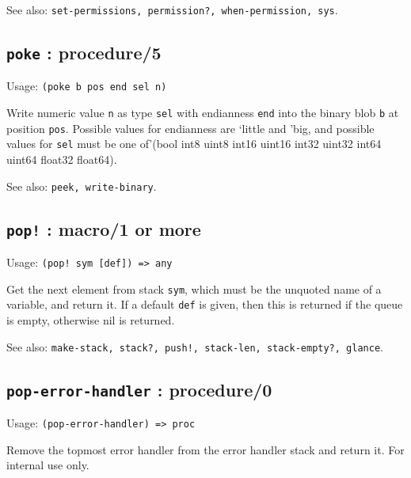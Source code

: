 \documentclass[
]{article}
\newcommand{\passthrough}[1]{#1}
\begin{document}
See also:
\passthrough{\lstinline!set-permissions, permission?, when-permission, sys!}.

\hypertarget{poke-procedure5-1}{%
\subsection{\texorpdfstring{\texttt{poke} :
procedure/5}{poke : procedure/5}}\label{poke-procedure5-1}}

Usage: \passthrough{\lstinline!(poke b pos end sel n)!}

Write numeric value \passthrough{\lstinline!n!} as type
\passthrough{\lstinline!sel!} with endianness
\passthrough{\lstinline!end!} into the binary blob
\passthrough{\lstinline!b!} at position \passthrough{\lstinline!pos!}.
Possible values for endianness are `little and 'big, and possible values
for \passthrough{\lstinline!sel!} must be one of'(bool int8 uint8 int16
uint16 int32 uint32 int64 uint64 float32 float64).

See also: \passthrough{\lstinline!peek, write-binary!}.

\hypertarget{pop-macro1-or-more-1}{%
\subsection{\texorpdfstring{\texttt{pop!} : macro/1 or
more}{pop! : macro/1 or more}}\label{pop-macro1-or-more-1}}

Usage: \passthrough{\lstinline"(pop! sym [def]) => any"}

Get the next element from stack \passthrough{\lstinline!sym!}, which
must be the unquoted name of a variable, and return it. If a default
\passthrough{\lstinline!def!} is given, then this is returned if the
queue is empty, otherwise nil is returned.

See also:
\passthrough{\lstinline"make-stack, stack?, push!, stack-len, stack-empty?, glance"}.

\hypertarget{pop-error-handler-procedure0-1}{%
\subsection{\texorpdfstring{\texttt{pop-error-handler} :
procedure/0}{pop-error-handler : procedure/0}}\label{pop-error-handler-procedure0-1}}

Usage: \passthrough{\lstinline!(pop-error-handler) => proc!}

Remove the topmost error handler from the error handler stack and return
it. For internal use only.
\end{document}
